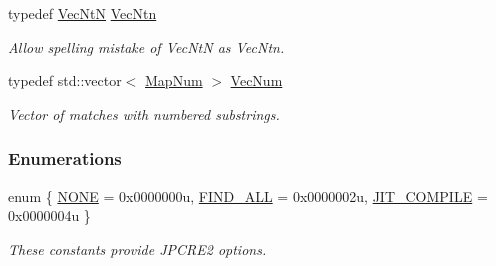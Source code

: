 \begin{DoxyCompactItemize}
typedef \hyperlink{namespacejpcre2_a88a7aaf84cad627d34c8152e726168eb}{Vec\+NtN} \hyperlink{namespacejpcre2_a8d6b7b4c873bc7cb4626f950d2b40f9d}{Vec\+Ntn}
\begin{DoxyCompactList}\small\item\em Allow spelling mistake of Vec\+NtN as Vec\+Ntn. \end{DoxyCompactList}\item 
\hypertarget{namespacejpcre2_ac1cf752c8fbb0be78020be3b80e77ce3}{}\label{namespacejpcre2_ac1cf752c8fbb0be78020be3b80e77ce3} 
typedef std\+::vector$<$ \hyperlink{namespacejpcre2_a947e37f0e4a1678157e7f1f855638e82}{Map\+Num} $>$ \hyperlink{namespacejpcre2_ac1cf752c8fbb0be78020be3b80e77ce3}{Vec\+Num}
\begin{DoxyCompactList}\small\item\em Vector of matches with numbered substrings. \end{DoxyCompactList}\end{DoxyCompactItemize}
\subsubsection*{Enumerations}
\begin{DoxyCompactItemize}
\item 
enum \{ \newline
\hyperlink{namespacejpcre2_a85c143271501e383843f45b9999c2f00_a85c143271501e383843f45b9999c2f00aecf4a781b081ff541006fbe84e143fb9}{N\+O\+NE} = 0x0000000u, 
\newline
\hyperlink{namespacejpcre2_a85c143271501e383843f45b9999c2f00_a85c143271501e383843f45b9999c2f00af29fccdb263520155e9c25a826a7200c}{F\+I\+N\+D\+\_\+\+A\+LL} = 0x0000002u, 
\newline
\hyperlink{namespacejpcre2_a85c143271501e383843f45b9999c2f00_a85c143271501e383843f45b9999c2f00a5e8bab7c478015b19baf3e84ed00876e}{J\+I\+T\+\_\+\+C\+O\+M\+P\+I\+LE} = 0x0000004u
 \}\begin{DoxyCompactList}\small\item\em These constants provide J\+P\+C\+R\+E2 options. \end{DoxyCompactList}
\end{DoxyCompactItemize}
